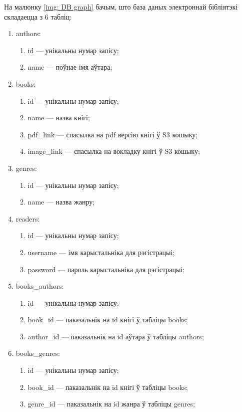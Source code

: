 На малюнку \ref{img: DB graph} бачым, што база даных электроннай бібліятэкі складаецца з 6 табліц:
\begin{enumerate}
    \item authors:
    \begin{enumerate}
        \item id --- унікальны нумар запісу;
        \item name --- поўнае імя аўтара;
    \end{enumerate}
    \item books:
    \begin{enumerate}
        \item id --- унікальны нумар запісу;
        \item name --- назва кнігі;
        \item pdf\_link --- спасылка на pdf версію кнігі ў S3 кошыку;
        \item image\_link --- спасылка на вокладку кнігі ў S3 кошыку;
    \end{enumerate}
    \item genres:
    \begin{enumerate}
        \item id --- унікальны нумар запісу;
        \item name --- назва жанру;
    \end{enumerate}
    \item readers:
    \begin{enumerate}
        \item id --- унікальны нумар запісу;
        \item username --- імя карыстальніка для рэгістрацыі;
        \item password --- пароль карыстальніка для рэгістрацыі;
    \end{enumerate}
    \item books\_authors:
    \begin{enumerate}
        \item id --- унікальны нумар запісу;
        \item book\_id --- паказальнік на id кнігі ў табліцы books;
        \item author\_id --- паказальнік на id аўтара ў табліцы authors;
    \end{enumerate}

    \clearpage

    \item books\_genres:
    \begin{enumerate}
        \item id --- унікальны нумар запісу;
        \item book\_id --- паказальнік на id кнігі ў табліцы books;
        \item genre\_id --- паказальнік на id жанра ў табліцы genres;
    \end{enumerate}
\end{enumerate}

